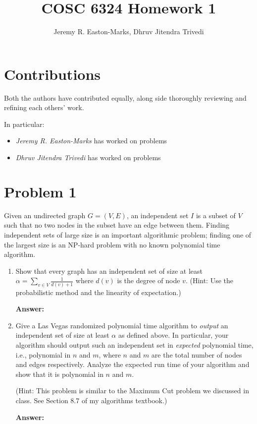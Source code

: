 \documentclass[11pt]{article}
\date{}
\begin{document}
\title{ COSC 6324 Homework 1}
\author{Jeremy R. Easton-Marks, Dhruv Jitendra Trivedi \\
 }

 \maketitle

\section*{Contributions}
Both the authors have contributed equally, along side thoroughly reviewing and refining each others' work.

In particular:
\begin{itemize}
    \item \emph{Jeremy R. Easton-Marks} has worked on problems 
    \item \emph{Dhruv Jitendra Trivedi} has worked on problems 
\end{itemize}

\section*{Problem 1}


Given an undirected graph $G=(V,E)$, an independent set $I$ is a subset of $V$ such that no two nodes
in the subset have an edge between them. Finding  independent sets of large size is an important algorithmic problem;
finding one of the largest size is an NP-hard problem with no known polynomial time algorithm.
\begin{enumerate}
\item Show that every graph has an independent set of size at least $ \alpha = \sum_{v \in V}\frac{1}{d(v)+1}$
where   $d(v)$ is the degree of node $v$. (Hint: Use  the probabilistic method and the linearity of expectation.)

    \textbf{Answer:}

\item Give a Las Vegas randomized polynomial time algorithm to {\em output} an independent set of size at least $\alpha$ as defined above.
In particular, your algorithm should output such an independent set in {\em expected} polynomial time, i.e., polynomial
in $n$ and $m$, where $n$ and $m$ are the total number of nodes and edges respectively. Analyze the expected run time of your algorithm and show that it is polynomial in $n$ and $m$.

(Hint: This problem is similar to the Maximum Cut problem we discussed in class. See Section 8.7 of my algorithms textbook.)  

    \textbf{Answer:}
\end{enumerate}
\end{document}
